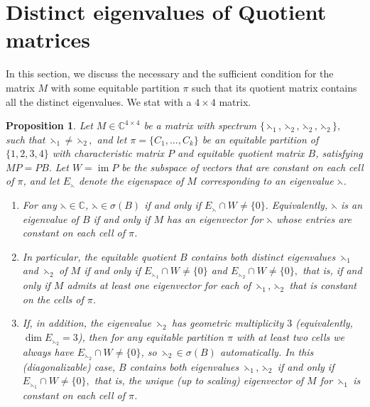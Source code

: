 \documentclass[12pt,twoside]{article}
\newtheorem{proposition}[theorem]{Proposition}
\begin{document}
\section{Distinct eigenvalues of Quotient matrices}\label{section 4}
In this section, we discuss the necessary and the sufficient condition for the matrix $M$ with some equitable partition $\pi$ such that its quotient matrix contains all the distinct eigenvalues. We stat with a $4\times 4$ matrix. 
\begin{proposition}\label{prop 1}
	Let $M\in\mathbb{C}^{4\times 4}$ be a matrix with spectrum $\{\leftthreetimes_1,\leftthreetimes_2,\leftthreetimes_2,\leftthreetimes_2\},$ such that  $ \leftthreetimes_1\neq \leftthreetimes_2,$
	and let $\pi=\{C_1,\dots,C_k\}$ be an equitable partition of $\{1,2,3,4\}$ with
	characteristic matrix $P$ and equitable quotient matrix $B$, satisfying   $MP = PB.$
	Let $W=\operatorname{im}P$ be the subspace of vectors that are constant on each
	cell of $\pi$, and let $E_\leftthreetimes$ denote the eigenspace of $M$ corresponding to
	an eigenvalue $\leftthreetimes$.
	\begin{enumerate}[nosep]
		\item For any $\leftthreetimes\in\mathbb{C}$,  $\leftthreetimes\in\sigma(B)$ if and only if $E_\leftthreetimes\cap W\neq\{0\}.$	Equivalently, $\leftthreetimes$ is an eigenvalue of $B$ if and only if $M$ has an
		eigenvector for $\leftthreetimes$ whose entries are constant on each cell of $\pi$.
		\item In particular, the equitable quotient $B$ contains \emph{both} distinct
		eigenvalues $\leftthreetimes_1$ and $\leftthreetimes_2$ of $M$ if and only if $E_{\leftthreetimes_1}\cap W\neq\{0\}$
		 and	$E_{\leftthreetimes_2}\cap W\neq\{0\},$ that is, if and only if $M$ admits at least one eigenvector for each of
		$\leftthreetimes_1,\leftthreetimes_2$ that is constant on the cells of $\pi$.
		
		\item If, in addition, the eigenvalue $\leftthreetimes_2$ has geometric multiplicity
		$3$ (equivalently, $\dim E_{\leftthreetimes_2}=3$), then for any equitable partition
		$\pi$ with at least two cells we always have $E_{\leftthreetimes_2}\cap W\neq\{0\}$,
		so $\leftthreetimes_2\in\sigma(B)$ automatically. In this (diagonalizable) case, $B$
		contains both eigenvalues $\leftthreetimes_1,\leftthreetimes_2$ if and only if $E_{\leftthreetimes_1}\cap W\neq\{0\},$
		that is, the unique (up to scaling) eigenvector of $M$ for $\leftthreetimes_1$ is
		constant on each cell of $\pi$.
	\end{enumerate}

\end{proposition}
\end{document}
